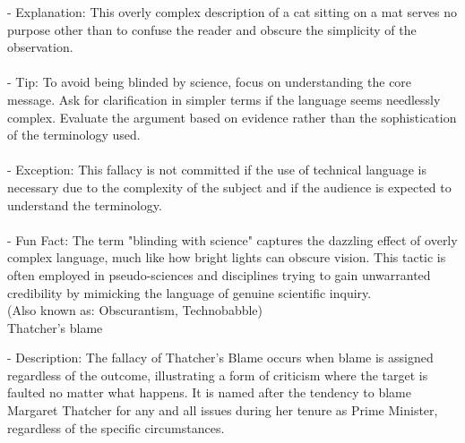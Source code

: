 \documentclass[a4paper,12pt,single,pdftex]{scrartcl}
\begin{document}
    
        - Explanation: This overly complex description of a cat sitting on a mat serves no purpose other than to confuse the reader and obscure the simplicity of the observation.
    \\

    
      
    \\

    
      - Tip: To avoid being blinded by science, focus on understanding the core message. Ask for clarification in simpler terms if the language seems needlessly complex. Evaluate the argument based on evidence rather than the sophistication of the terminology used.
    \\

    
      
    \\

    
      - Exception: This fallacy is not committed if the use of technical language is necessary due to the complexity of the subject and if the audience is expected to understand the terminology.
    \\

    
      
    \\

    
      - Fun Fact: The term "blinding with science" captures the dazzling effect of overly complex language, much like how bright lights can obscure vision. This tactic is often employed in pseudo-sciences and disciplines trying to gain unwarranted credibility by mimicking the language of genuine scientific inquiry.
    \\

  
    
      (Also known as: Obscurantism, Technobabble)
    \\

  

Thatcher’s blame
    
      - Description: The fallacy of Thatcher’s Blame occurs when blame is assigned regardless of the outcome, illustrating a form of criticism where the target is faulted no matter what happens. It is named after the tendency to blame Margaret Thatcher for any and all issues during her tenure as Prime Minister, regardless of the specific circumstances.
    \\

    
      
    \\
\end{document}
